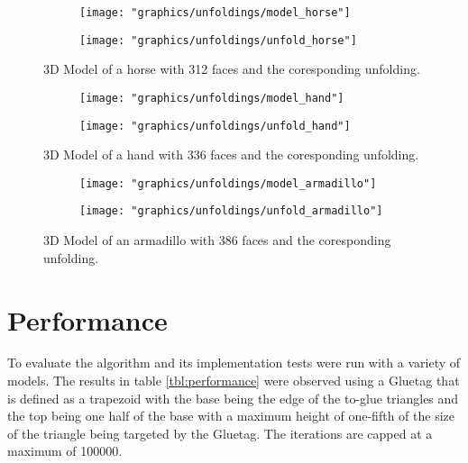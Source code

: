 \documentclass[draft,final]{vutinfth} %
\begin{document}
\begin{figure}
  \begin{subfigure}[b]{0.5\textwidth}
    \texttt{[image: "graphics/unfoldings/model\_horse"]}
  \end{subfigure}
  \begin{subfigure}[b]{0.5\textwidth}
    \texttt{[image: "graphics/unfoldings/unfold\_horse"]}
  \end{subfigure}
  
  \caption{3D Model of a horse with 312 faces and the coresponding unfolding.}
  \label{fig:horse}
\end{figure}

\begin{figure}
  \begin{subfigure}[b]{0.5\textwidth}
    \texttt{[image: "graphics/unfoldings/model\_hand"]}
  \end{subfigure}
  \begin{subfigure}[b]{0.5\textwidth}
    \texttt{[image: "graphics/unfoldings/unfold\_hand"]}
  \end{subfigure}
  
  \caption{3D Model of a hand with 336 faces and the coresponding unfolding.}
  \label{fig:hand}
\end{figure}

\begin{figure}
  \begin{subfigure}[b]{0.5\textwidth}
    \texttt{[image: "graphics/unfoldings/model\_armadillo"]}
  \end{subfigure}
  \begin{subfigure}[b]{0.5\textwidth}
    \texttt{[image: "graphics/unfoldings/unfold\_armadillo"]}
  \end{subfigure}
  
  \caption{3D Model of an armadillo with 386 faces and the coresponding unfolding.}
  \label{fig:armadillo}
\end{figure}

\section{Performance}
\label{sec:performance}

To evaluate the algorithm and its implementation tests were run with a variety of models. The results in table \ref{tbl:performance} were observed using a Gluetag that is defined as a trapezoid with the base being the edge of the to-glue triangles and the top being one half of the base with a maximum height of one-fifth of the size of the triangle being targeted by the Gluetag. The iterations are capped at a maximum of 100000.
\end{document}
